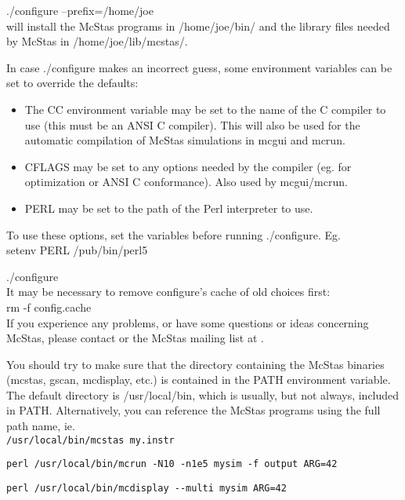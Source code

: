   ./configure --prefix=/home/joe\\

\noindent will install the McStas programs in /home/joe/bin/ and the
library files needed by McStas in /home/joe/lib/mcstas/.

In case ./configure makes an incorrect guess, some environment variables
can be set to override the defaults:
\begin{itemize}
\item{The CC environment variable may be set to the name of the C compiler
   to use (this must be an ANSI C compiler). This will also be used for
   the automatic compilation of McStas simulations in mcgui and
   mcrun.}
\item{CFLAGS may be set to any options needed by the compiler (eg. for
   optimization or ANSI C conformance). Also used by mcgui/mcrun.}
\item{PERL may be set to the path of the Perl interpreter to use.}
\end{itemize}
\noindent To use these options, set the variables before running ./configure. Eg.\\

    setenv PERL /pub/bin/perl5

    ./configure\\

\noindent It may be necessary to remove configure's cache of old
choices first:\\


    rm -f config.cache\\


\noindent If you experience any problems, or have some questions or ideas
concerning McStas, please contact
or the McStas mailing list at .

You should try to make sure that the directory containing the McStas
binaries (mcstas, gscan, mcdisplay, etc.) is contained in the PATH
environment variable. The default directory is /usr/local/bin, which is
usually, but not always, included in PATH. Alternatively, you can
reference the McStas programs using the full path name, ie.\\

  \verb+/usr/local/bin/mcstas my.instr+

  \verb+perl /usr/local/bin/mcrun -N10 -n1e5 mysim -f output ARG=42+

  \verb+perl /usr/local/bin/mcdisplay --multi mysim ARG=42+\\

